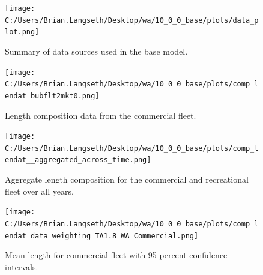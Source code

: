 \documentclass[11pt,
  english,
  letterpaper,
]{article}
\begin{document}
\tagmcend\tagstructend


\begin{figure}
\centering
\texttt{[image: C:/Users/Brian.Langseth/Desktop/wa/10\_0\_0\_base/plots/data\_plot.png]}
\caption{Summary of data sources used in the base model.\label{fig:data-plot}}
\end{figure}

\tagmcend\tagstructend


\begin{figure}
\centering
\texttt{[image: C:/Users/Brian.Langseth/Desktop/wa/10\_0\_0\_base/plots/comp\_lendat\_bubflt2mkt0.png]}
\caption{Length composition data from the commercial fleet.\label{fig:com-len-data}}
\end{figure}

\tagmcend\tagstructend


\begin{figure}
\centering
\texttt{[image: C:/Users/Brian.Langseth/Desktop/wa/10\_0\_0\_base/plots/comp\_lendat\_\_aggregated\_across\_time.png]}
\caption{Aggregate length composition for the commercial and recreational fleet over all years.\label{fig:wa-len-agg}}
\end{figure}

\tagmcend\tagstructend


\begin{figure}
\centering
\texttt{[image: C:/Users/Brian.Langseth/Desktop/wa/10\_0\_0\_base/plots/comp\_lendat\_data\_weighting\_TA1.8\_WA\_Commercial.png]}
\caption{Mean length for commercial fleet with 95 percent confidence intervals.\label{fig:mean-com-len-data}}
\end{figure}

\tagmcend\tagstructend

\end{document}
